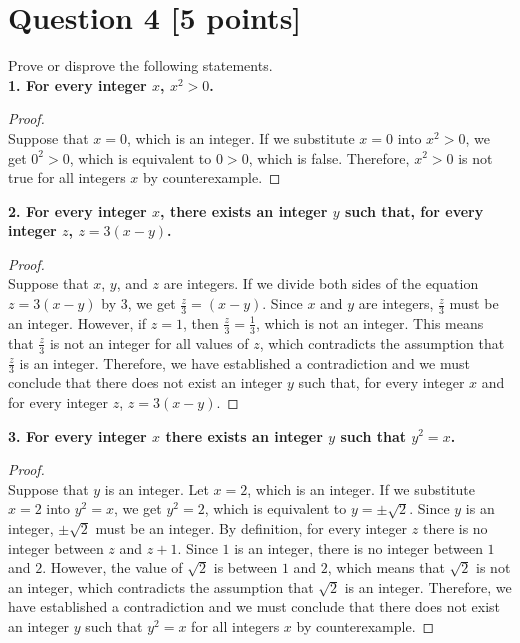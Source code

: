\documentclass{report}
\theoremstyle{mytheoremstyle}
\theoremstyle{mytheoremstyle}
\theoremstyle{myproblemstyle}
\begin{document}
\section*{Question 4 [5 points]}
Prove or disprove the following statements. 
\\[\baselineskip]
\noindent\textbf{1. For every integer $x$, $x^2 > 0$.}
\begin{proof} 
    $ $\\
    Suppose that $x = 0$, which is an integer. If we substitute $x = 0$ into $x^2 > 0$, we get $0^2 > 0$, which is equivalent to $0 > 0$, which is false. Therefore, $x^2 > 0$ is not true for all integers $x$ by counterexample.
\end{proof} 
\noindent\textbf{2. For every integer $x$, there exists an integer $y$ such that, for every integer $z$, $z = 3(x - y)$.} 
\begin{proof}
    $ $\\ 
    Suppose that $x$, $y$, and $z$ are integers. If we divide both sides of the equation $z=3(x-y)$ by $3$, we get $\frac{z}{3}=(x-y)$. Since $x$ and $y$ are integers, $\frac{z}{3}$ must be an integer. However, if $z = 1$, then $\frac{z}{3} = \frac{1}{3}$, which is not an integer. This means that $\frac{z}{3}$ is not an integer for all values of $z$, which contradicts the assumption that $\frac{z}{3}$ is an integer. Therefore, we have established a contradiction and we must conclude that there does not exist an integer $y$ such that, for every integer $x$ and for every integer $z$, $z = 3(x - y)$.
\end{proof}
\noindent\textbf{3. For every integer $x$ there exists an integer $y$ such that $y^2 = x$.}
\begin{proof}
    $ $\\ 
    Suppose that $y$ is an integer. Let $x = 2$, which is an integer.  If we substitute $x = 2$ into $y^2 = x$, we get $y^2 = 2$, which is equivalent to $y = \pm \sqrt{2}$. Since $y$ is an integer, $\pm \sqrt{2}$ must be an integer. By definition, for every integer $z$ there is no integer between $z$ and $z+1$. Since $1$ is an integer, there is no integer between $1$ and $2$. However, the value of $\sqrt{2}$ is between $1$ and $2$, which means that $\sqrt{2}$ is not an integer, which contradicts the assumption that $\sqrt{2}$ is an integer. Therefore, we have established a contradiction and we must conclude that there does not exist an integer $y$ such that $y^2 = x$ for all integers $x$ by counterexample.
\end{proof} 
\end{document}
